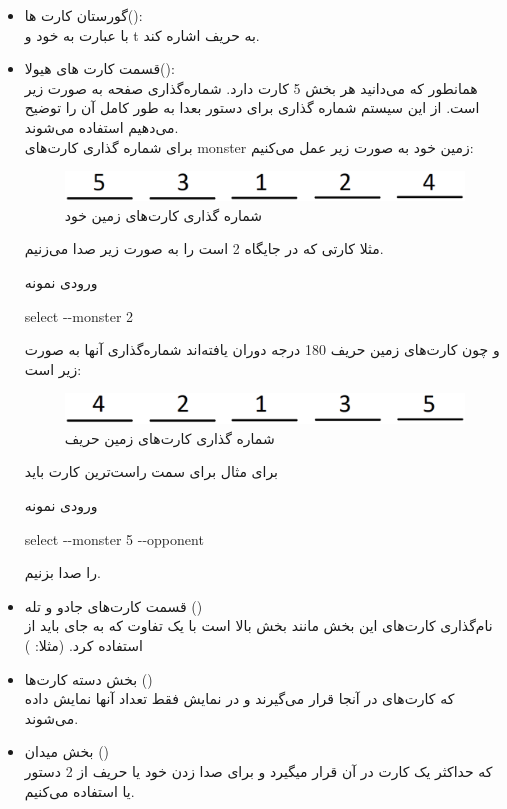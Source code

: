 \documentclass[]{article}
\begin{document}
\begin{itemize}
	\item گورستان کارت ها():
	\\
	با عبارت  به  خود و t 
	به  حریف اشاره کند.
	\item قسمت کارت های هیولا():
	\\
	همانطور که می‌دانید هر بخش 5 کارت دارد. شماره‌گذاری صفحه به صورت زیر است. 
	از این سیستم شماره گذاری برای دستور  بعدا به طور کامل آن را 
	توضیح 
	می‌دهیم استفاده می‌شوند.
	\\
	برای شماره گذاری کارت‌های monster زمین خود به صورت زیر عمل می‌کنیم:
	\begin{figure}[h]
		\centering
		\includegraphics[width=.5\paperwidth]{./Resources/CardsNumbering.png}
		\caption{شماره گذاری کارت‌های  زمین خود}
		\label{}
	\end{figure}
	مثلا کارتی که در جایگاه 2 است را به صورت زیر صدا می‌زنیم.
	\begin{mybox}[colback=yellow]{ورودی نمونه}
		\begin{latin}	
			select -{}-monster 2
		\end{latin}
	\end{mybox}
	و چون کارت‌های زمین حریف 180 درجه دوران یافته‌اند شماره‌گذاری آنها به صورت 
	زیر است:
	\begin{figure}[h]
		\centering
		\includegraphics[width=.5\paperwidth]{./Resources/CardsNumbering_1.png}
		\caption{شماره گذاری کارت‌های  زمین حریف}
		\label{}
	\end{figure}
	برای مثال برای سمت راست‌ترین کارت باید
	\begin{mybox}[colback=yellow]{ورودی نمونه}
		\begin{latin}	
			select -{}-monster 5 -{}-opponent 
		\end{latin}
	\end{mybox}
	را صدا بزنیم.
	 \item قسمت کارت‌های جادو و تله ()
	 \\
	 نام‌گذاری کارت‌های این بخش مانند بخش بالا است با یک تفاوت که به جای 
	  باید از  استفاده کرد. (مثلا:  )
	 
	 \item بخش دسته کارت‌ها ()
	 \\
	 که کارت‌های  در آنجا قرار می‌گیرند و در نمایش فقط تعداد آنها 
	 نمایش داده می‌شوند.
	 \item بخش میدان ()
	 \\
	 که حداکثر یک کارت در آن قرار میگیرد و برای صدا زدن  خود 
	 یا حریف از 2 دستور  یا 
	 استفاده می‌کنیم.
\end{itemize}
\end{document}
